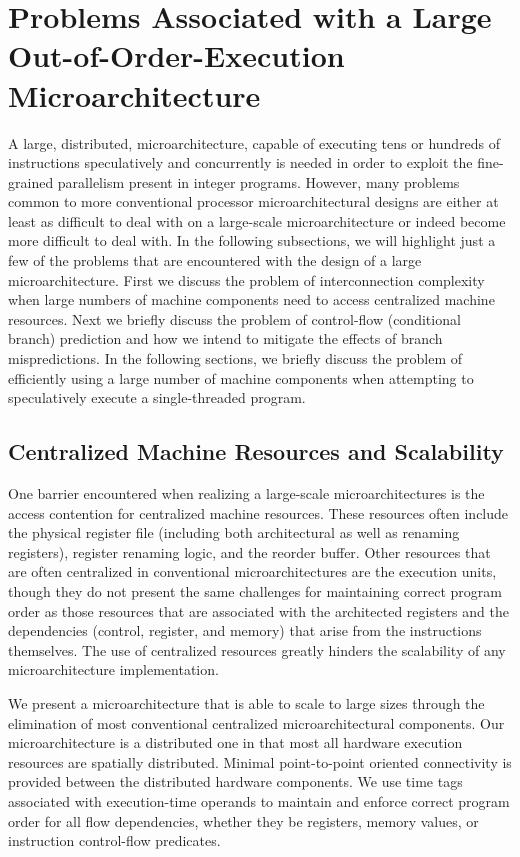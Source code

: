 %
\section{Problems Associated with a Large Out-of-Order-Execution 
Microarchitecture}
%
A large, distributed, microarchitecture, capable of executing tens or
hundreds of instructions speculatively and concurrently is 
needed in order to exploit the
fine-grained parallelism present in integer programs.
However, many problems common to more conventional processor 
microarchitectural designs
are either at least as difficult to deal with on a large-scale
microarchitecture or indeed become more difficult to deal with.
In the following subsections, we will highlight just a few of the problems
that are encountered with the design of a large microarchitecture.
First we discuss the problem of interconnection complexity
when large numbers of machine components need to access
centralized machine resources.  Next we briefly discuss
the problem of control-flow (conditional branch) prediction
and how we intend to mitigate the effects of branch mispredictions.
In the following sections, we briefly discuss the problem
of efficiently using a large number of machine components
when attempting to speculatively execute a single-threaded 
program.
%
\subsection{Centralized Machine Resources and Scalability}
%
One barrier encountered when realizing a large-scale
microarchitectures is the access contention for centralized machine
resources.  These resources often include the physical register file
(including both architectural as well as renaming registers), register
renaming logic, and the reorder buffer.  Other resources that are often
centralized in conventional microarchitectures are the execution units,
though they do not present the same challenges for maintaining correct
program order as those resources that are associated with the
architected registers and the dependencies (control, register, and
memory) that arise from the instructions themselves.  The use of
centralized resources greatly hinders the scalability of any
microarchitecture implementation.

We present a microarchitecture that is able to scale to large sizes
through the elimination of most conventional centralized
microarchitectural components.  
Our microarchitecture is a distributed one in that most
all hardware execution resources are spatially distributed.
Minimal point-to-point oriented connectivity is provided between
the distributed hardware components.
We use time tags associated
with execution-time operands to
maintain and enforce correct program order for all flow dependencies,
whether they be registers, memory values, or instruction control-flow
predicates.
%

